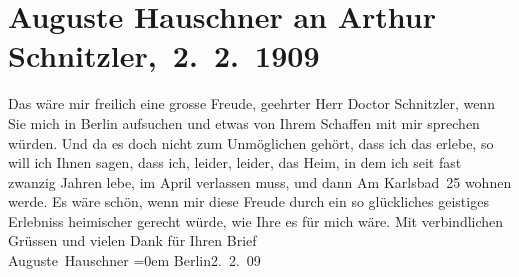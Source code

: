 

         
         \renewcommand{\erwaehntePersonen}{Personen: Auguste Hauschner}
         \renewcommand{\erwaehnteOrte}{Orte: Am Karlsbad, Berlin, Wien}
         \renewcommand{\erwaehnteWerke}{}
               \section[ Auguste Hauschner an Arthur Schnitzler, 2. 2. 1909]{ Auguste Hauschner an Arthur Schnitzler, 2. 2. 1909}\nopagebreak{}\rehead{ }\begin{ledgroupsized}[t]{13cm}\normalsize\beginnumbering \toendnotes[C]{\smallbreak\pagebreak[2]} 
\toendnotes[C]{\smallbreak}\pstart
           \noindent{}{\pb}Das wäre mir freilich eine grosse Freude, geehrter Herr
               Doctor Schnitzler, wenn Sie mich in Berlin
               aufsuchen und etwas von Ihrem Schaffen mit mir sprechen würden. Und da es doch nicht
               zum Unmöglichen gehört, dass ich das erlebe, so will ich Ihnen sagen, dass ich,
               leider, leider, das Heim, in dem ich seit fast zwanzig Jahren lebe, im April verlassen muss, und dann Am {\pb}Karlsbad 25 wohnen werde.\pend
           \pstart
           Es wäre schön, wenn mir diese Freude durch ein so glückliches geistiges Erlebniss
               heimischer gerecht würde, wie Ihre \label{K_L02588-1v}\label{K_L02588-1h} es für mich wäre.\pend
           \pstart
           Mit verbindlichen Grüssen und vielen Dank für Ihren Brief{\\[\baselineskip]}\spacefill\mbox{Auguste Hauschner}\pend
           \leftskip=0em{}\pstart
           Berlin2. 2. 09\pend
           
         
         \endnumbering{}\end{ledgroupsized}  \newcommand{\dateiname}{L02588}\newcommand{\titel}{Auguste Hauschner an Arthur Schnitzler, 2. 2. 1909}\newcommand{\editorInnen}{Martin Anton Müller und Laura Untner}
      